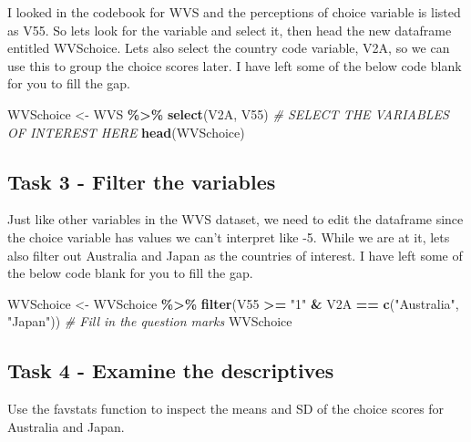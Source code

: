 \documentclass[
]{article}
\newenvironment{Shaded}{\begin{snugshade}}{\end{snugshade}}
\newcommand{\CommentTok}[1]{\textcolor[rgb]{0.56,0.35,0.01}{\textit{#1}}}
\newcommand{\FunctionTok}[1]{\textcolor[rgb]{0.13,0.29,0.53}{\textbf{#1}}}
\newcommand{\NormalTok}[1]{#1}
\newcommand{\OtherTok}[1]{\textcolor[rgb]{0.56,0.35,0.01}{#1}}
\newcommand{\SpecialCharTok}[1]{\textcolor[rgb]{0.81,0.36,0.00}{\textbf{#1}}}
\newcommand{\StringTok}[1]{\textcolor[rgb]{0.31,0.60,0.02}{#1}}
\begin{document}
I looked in the codebook for WVS and the perceptions of choice variable
is listed as V55. So lets look for the variable and select it, then head
the new dataframe entitled WVSchoice. Lets also select the country code
variable, V2A, so we can use this to group the choice scores later. I
have left some of the below code blank for you to fill the gap.

\begin{Shaded}
\begin{Highlighting}[]
\NormalTok{WVSchoice }\OtherTok{\textless{}{-}} 
\NormalTok{  WVS }\SpecialCharTok{\%\textgreater{}\%} 
  \FunctionTok{select}\NormalTok{(V2A, V55) }\CommentTok{\# SELECT THE VARIABLES OF INTEREST HERE}
\FunctionTok{head}\NormalTok{(WVSchoice)}
\end{Highlighting}
\end{Shaded}

\subsection{Task 3 - Filter the
variables}\label{task-3---filter-the-variables}

Just like other variables in the WVS dataset, we need to edit the
dataframe since the choice variable has values we can't interpret like
-5. While we are at it, lets also filter out Australia and Japan as the
countries of interest. I have left some of the below code blank for you
to fill the gap.

\begin{Shaded}
\begin{Highlighting}[]
\NormalTok{WVSchoice }\OtherTok{\textless{}{-}} 
\NormalTok{WVSchoice }\SpecialCharTok{\%\textgreater{}\%} 
\FunctionTok{filter}\NormalTok{(V55 }\SpecialCharTok{\textgreater{}=} \StringTok{"1"} \SpecialCharTok{\&}\NormalTok{ V2A }\SpecialCharTok{==} \FunctionTok{c}\NormalTok{(}\StringTok{"Australia"}\NormalTok{, }\StringTok{"Japan"}\NormalTok{)) }\CommentTok{\# Fill in the question marks }
\NormalTok{WVSchoice}
\end{Highlighting}
\end{Shaded}

\subsection{Task 4 - Examine the
descriptives}\label{task-4---examine-the-descriptives}

Use the favstats function to inspect the means and SD of the choice
scores for Australia and Japan.
\end{document}
